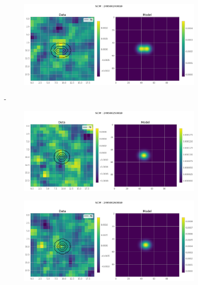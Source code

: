 \documentclass[
	a4paper, %
	10pt, %
	unnumberedsections, %
	twoside, %
]{LTJournalArticle}
\begin{document}
    \begin{figure}[H]
    \centering
    \begin{subfigure}{.4\textwidth}
        \includegraphics[width=\textwidth]{report/Figures/models/2404/24_psf_const.png}
    \end{subfigure}%
    \hspace{1em}-
    \begin{subfigure}{.4\textwidth}
        \centering
        \includegraphics[width=\textwidth]{report/Figures/models/2404/25_psf_const.png}
    \end{subfigure}
    \begin{subfigure}{.4\textwidth}
        \centering
        \includegraphics[width=\textwidth]{report/Figures/models/2404/26_psf_const.png}

\end{subfigure}
\end{figure}
\end{document}
